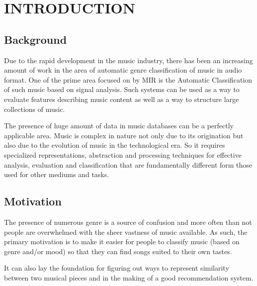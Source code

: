 \newpage
\section{INTRODUCTION}

\subsection{Background}

\par Due to the rapid development in the music industry, there has been an increasing amount of work in the area of automatic genre classification
of music in audio format. One of the prime area focused on by MIR is the Automatic Classification of such music based on signal analysis. Such systems
can be used as a way to evaluate features describing music content as well as a way to structure large collections of music.\\
\par The presence of huge amount of data in music databases can be a perfectly applicable area. Music is complex in nature not only due to its origination
but also due to the evolution of music in the technological era. So it requires specialized representations, abstraction and processing techniques for effective
analysis, evaluation and classification that are fundamentally different form those used for other mediums and tasks.\\

\subsection{Motivation}
The presence of numerous genre is a source of confusion and more often than not people are overwhelmed with the sheer vastness of music available. As
such, the primary motivation is to make it easier for people to classify music (based on genre and/or mood) so that they can find songs suited to their
own tastes.\\ 
\par It can also lay the foundation for figuring out ways to represent similarity between two musical pieces and in the making of a
good recommendation system.\\ 

